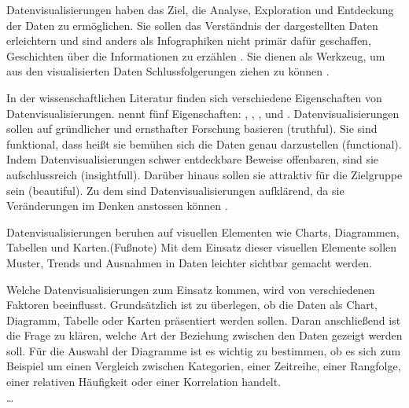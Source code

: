 Datenvisualisierungen haben das Ziel, die Analyse, Exploration und Entdeckung der Daten zu ermöglichen. Sie sollen das Verständnis der dargestellten Daten erleichtern
und sind anders als Infographiken nicht primär dafür geschaffen, Geschichten über die Informationen zu erzählen \cite[Vgl.][20 ff.]{kirk_data_2019}. 
Sie dienen als Werkzeug, um aus den visualisierten Daten Schlussfolgerungen ziehen zu können \cite[Vgl.][31]{cairo_truthful_2016}. %

In der wissenschaftlichen Literatur finden sich verschiedene Eigenschaften von Datenvisualisierungen. \citeauthor{cairo_truthful_2016}
nennt fünf Eigenschaften: \textit{}, \textit{}, \textit{}, \textit{} und \textit{}.
Datenvisualisierungen sollen auf gründlicher und ernsthafter Forschung basieren (truthful). Sie sind funktional, dass heißt
sie bemühen sich die Daten genau darzustellen (functional). Indem Datenvisualisierungen schwer entdeckbare Beweise offenbaren, 
sind sie aufschlussreich (insightfull). Darüber hinaus sollen sie attraktiv für die Zielgruppe sein (beautiful).
Zu dem sind Datenvisualisierungen aufklärend, da sie Veränderungen im Denken anstossen können \cite[Vgl.][45]{cairo_truthful_2016}. 


Datenvisualisierungen beruhen auf visuellen Elementen wie Charts, Diagrammen, Tabellen und Karten.(Fußnote)
Mit dem Einsatz dieser visuellen Elemente sollen Muster, Trends und Ausnahmen in Daten leichter sichtbar gemacht werden.

Welche Datenvisualisierungen zum Einsatz kommen, wird von verschiedenen Faktoren beeinflusst.
Grundsätzlich ist zu überlegen, ob die Daten als Chart, Diagramm, Tabelle oder Karten präsentiert werden sollen.
Daran anschließend ist die Frage zu klären, welche Art der Beziehung zwischen den Daten gezeigt werden soll.
Für die Auswahl der Diagramme ist es wichtig zu bestimmen, ob es sich zum Beispiel um einen Vergleich zwischen Kategorien, einer Zeitreihe, einer Rangfolge, 
einer relativen Häufigkeit oder einer Korrelation handelt.\cite[Vgl.][137]{few_show_2012}\\
\dots

